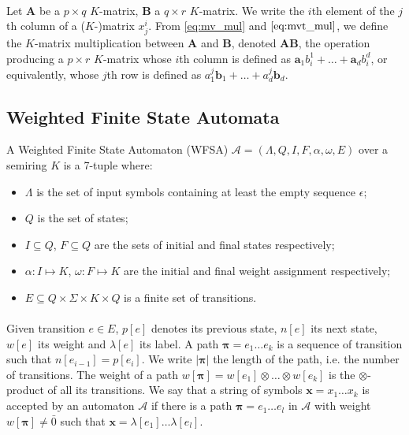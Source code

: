 \paragraph{} Let $\mathbf{A}$ be a $p \times q$ $K$-matrix, $\mathbf{B}$ a $q \times r$ $K$-matrix. We write the $i$th element of the $j$th column of a ($K$-)matrix $x_j^i$. From \eqref{eq:mv_mul} and $\eqref{eq:mvt_mul}$, we define the $K$-matrix multiplication between $\mathbf{A}$ and $\mathbf{B}$, denoted $\mathbf{A} \mathbf{B}$, the operation producing a $p \times r$ $K$-matrix whose $i$th column is defined as $ \mathbf{a}_1 b_i^1 + \dots + \mathbf{a}_d b_i^d$, or equivalently, whose $j$th row is defined as $a^j_1 \mathbf{b}_1 + \dots + a^j_d \mathbf{b}_d $.

\subsection{Weighted Finite State Automata}

A Weighted Finite State Automaton (WFSA) \cite{Mohri2008} $\mathcal{A} = (\Lambda, Q, I, F, \alpha, \omega, E)$ over a semiring $K$ is a 7-tuple where:
\begin{itemize}
    \item $\Lambda$ is the set of input symbols containing at least the empty sequence $\epsilon$;
    \item $Q$ is the set of states;
    \item $I \subseteq Q$, $F \subseteq Q$ are the sets of initial and final states respectively;
    \item $\alpha : I \mapsto K$, $\omega : F \mapsto K$ are the initial and final weight assignment respectively;
    \item $E \subseteq Q \times \Sigma \times K \times Q$ is a finite set of transitions.
\end{itemize}

\paragraph{} Given transition $e \in E$, $p[e]$ denotes its previous state, $n[e]$ its next state, $w[e]$ its weight and $\lambda[e]$ its label. A path $\boldsymbol{\pi} = e_1 \dots e_k$ is a sequence of transition such that $n[e_{i-1}] = p[e_i]$. We write $|\boldsymbol{\pi}|$ the length of the path, i.e. the number of transitions. The weight of a path $w[\boldsymbol{\pi}] = w[e_1] \otimes \dots \otimes w[e_k]$ is the $\otimes$-product of all its transitions. We say that a string of symbols $\mathbf{x} = x_1 \dots x_k$ is accepted by an automaton $\mathcal{A}$ if there is a path $\boldsymbol{\pi} = e_1 \dots e_l$ in $\mathcal{A}$ with weight $w[\boldsymbol{\pi}] \neq \bar{0}$ such that $\mathbf{x} = \lambda[e_1] \dots \lambda[e_l]$. 

